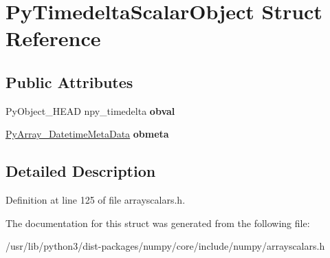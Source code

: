 \hypertarget{structPyTimedeltaScalarObject}{}\section{Py\+Timedelta\+Scalar\+Object Struct Reference}
\label{structPyTimedeltaScalarObject}
\subsection*{Public Attributes}
\begin{DoxyCompactItemize}
\item 
Py\+Object\+\_\+\+H\+E\+AD npy\+\_\+timedelta {\bfseries obval}\hypertarget{structPyTimedeltaScalarObject_a44e85d0dc4d7671e44ebd573614f7170}{}\label{structPyTimedeltaScalarObject_a44e85d0dc4d7671e44ebd573614f7170}

\item 
\hyperlink{structPyArray__DatetimeMetaData}{Py\+Array\+\_\+\+Datetime\+Meta\+Data} {\bfseries obmeta}\hypertarget{structPyTimedeltaScalarObject_a2eae1afd3d2801865e719c6100099e00}{}\label{structPyTimedeltaScalarObject_a2eae1afd3d2801865e719c6100099e00}

\end{DoxyCompactItemize}


\subsection{Detailed Description}


Definition at line 125 of file arrayscalars.\+h.



The documentation for this struct was generated from the following file\+:\begin{DoxyCompactItemize}
\item 
/usr/lib/python3/dist-\/packages/numpy/core/include/numpy/arrayscalars.\+h\end{DoxyCompactItemize}
